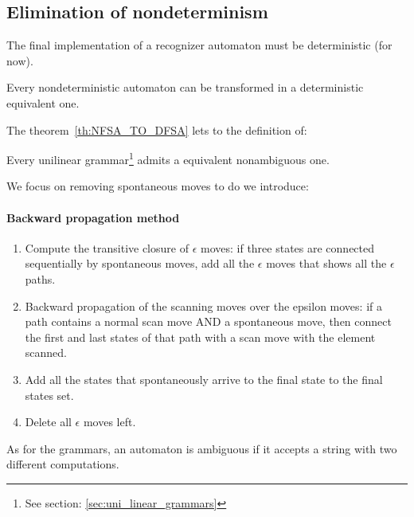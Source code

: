 		\subsection{Elimination of nondeterminism}
			The final implementation of a recognizer automaton must be deterministic (for now).
			\begin{theorem}\label{th:NFSA_TO_DFSA}
				Every nondeterministic automaton can be transformed in a deterministic equivalent one.
			\end{theorem}
			The theorem~\ref{th:NFSA_TO_DFSA} lets to the definition of:
			\begin{corollary}
				Every unilinear grammar\footnote{See section: \ref{sec:uni_linear_grammars}}  admits a equivalent nonambiguous one.
			\end{corollary}
			We focus on removing spontaneous moves to do we introduce:
			\paragraph{Backward propagation method}
				\begin{enumerate}
					\item Compute the transitive closure of $\epsilon$ moves: if three states are connected sequentially by spontaneous moves, add all the $\epsilon$ moves that shows all the $\epsilon$ paths.
					\item Backward propagation of the scanning moves over the epsilon moves: if a path contains a normal scan move AND a spontaneous move, then connect the first and last states of that path with a scan move with the element scanned.
					\item Add all the states that spontaneously arrive to the final state to the final states set.
					\item Delete all $\epsilon$ moves left.
				\end{enumerate}
				
			\begin{definition}[Ambiguity]
				As for the grammars, an automaton is ambiguous if it accepts a string with two different computations. 
			\end{definition}
	
